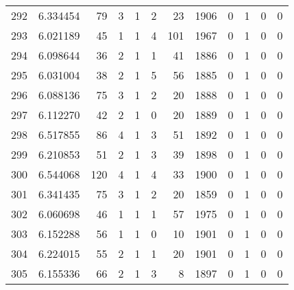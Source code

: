 \begin{tabular}{lrrrrrrrrrrr}
292 &  6.334454 &   79 &      3 &        1 &      2 &              23 &  1906 &               0 &               1 &               0 &               0 \\
293 &  6.021189 &   45 &      1 &        1 &      4 &             101 &  1967 &               0 &               1 &               0 &               0 \\
294 &  6.098644 &   36 &      2 &        1 &      1 &              41 &  1886 &               0 &               1 &               0 &               0 \\
295 &  6.031004 &   38 &      2 &        1 &      5 &              56 &  1885 &               0 &               1 &               0 &               0 \\
296 &  6.088136 &   75 &      3 &        1 &      2 &              20 &  1888 &               0 &               1 &               0 &               0 \\
297 &  6.112270 &   42 &      2 &        1 &      0 &              20 &  1889 &               0 &               1 &               0 &               0 \\
298 &  6.517855 &   86 &      4 &        1 &      3 &              51 &  1892 &               0 &               1 &               0 &               0 \\
299 &  6.210853 &   51 &      2 &        1 &      3 &              39 &  1898 &               0 &               1 &               0 &               0 \\
300 &  6.544068 &  120 &      4 &        1 &      4 &              33 &  1900 &               0 &               1 &               0 &               0 \\
301 &  6.341435 &   75 &      3 &        1 &      2 &              20 &  1859 &               0 &               1 &               0 &               0 \\
302 &  6.060698 &   46 &      1 &        1 &      1 &              57 &  1975 &               0 &               1 &               0 &               0 \\
303 &  6.152288 &   56 &      1 &        1 &      0 &              10 &  1901 &               0 &               1 &               0 &               0 \\
304 &  6.224015 &   55 &      2 &        1 &      1 &              20 &  1901 &               0 &               1 &               0 &               0 \\
305 &  6.155336 &   66 &      2 &        1 &      3 &               8 &  1897 &               0 &               1 &               0 &               0 \\

\end{tabular}
